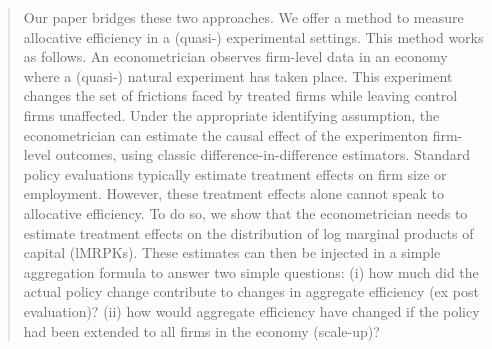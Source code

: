 \documentclass{tufte-handout}
\theoremstyle{break}
\begin{document}
\begin{fullwidth}
  \begin{quote}
    Our paper bridges these two approaches. We offer a method to measure allocative efficiency in a (quasi-) experimental settings. This method works as follows. An econometrician observes firm-level data in an economy where a (quasi-) natural experiment has taken place. This experiment changes the set of frictions faced by treated firms while leaving control firms unaffected. Under the appropriate identifying assumption, the econometrician can estimate the causal effect of the experimenton firm-level outcomes, using classic difference-in-difference estimators. Standard policy evaluations typically estimate treatment effects on firm size or employment. However, these treatment effects alone cannot speak to allocative efficiency. To do so, we show that the econometrician needs to estimate treatment effects on the distribution of log marginal products of capital (lMRPKs). These estimates can then be injected in a simple aggregation formula to answer two simple questions: (i) how much did the actual policy change contribute to changes in aggregate efficiency (ex post evaluation)? (ii) how would aggregate efficiency have changed if the policy had been extended to all firms in the economy (scale-up)?
  \end{quote}
\end{fullwidth}




\end{document}
